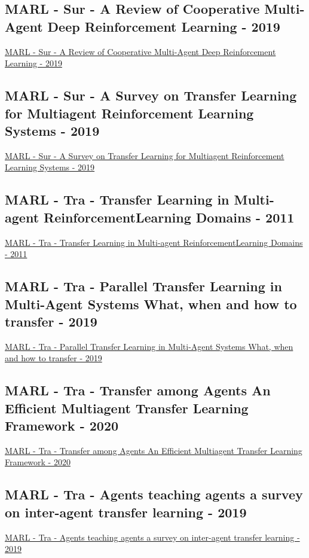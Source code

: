 \subsection{MARL - Sur - A Review of Cooperative Multi-Agent Deep Reinforcement Learning - 2019}
\href{https://arxiv.org/abs/1908.03963}{MARL - Sur - A Review of Cooperative Multi-Agent Deep Reinforcement Learning - 2019}

\subsection{MARL - Sur - A Survey on Transfer Learning for Multiagent Reinforcement Learning Systems  - 2019}
\href{https://www.jair.org/index.php/jair/article/view/11396}{MARL - Sur - A Survey on Transfer Learning for Multiagent Reinforcement Learning Systems  - 2019}

\subsection{MARL - Tra - Transfer Learning in Multi-agent ReinforcementLearning Domains - 2011}
\href{https://link.springer.com/chapter/10.1007/978-3-642-29946-9_25}{MARL - Tra - Transfer Learning in Multi-agent ReinforcementLearning Domains - 2011}

\subsection{MARL - Tra - Parallel Transfer Learning in Multi-Agent Systems What, when and how to transfer - 2019}
\href{https://ieeexplore.ieee.org/abstract/document/8851784}{MARL - Tra - Parallel Transfer Learning in Multi-Agent Systems What, when and how to transfer - 2019}

\subsection{MARL - Tra - Transfer among Agents An Efficient Multiagent Transfer Learning Framework - 2020}
\href{https://arxiv.org/abs/2002.08030}{MARL - Tra - Transfer among Agents An Efficient Multiagent Transfer Learning Framework - 2020}

\subsection{MARL - Tra - Agents teaching agents a survey on inter-agent transfer learning - 2019}
\href{https://link.springer.com/article/10.1007/s10458-019-09430-0}{MARL - Tra - Agents teaching agents a survey on inter-agent transfer learning - 2019}

